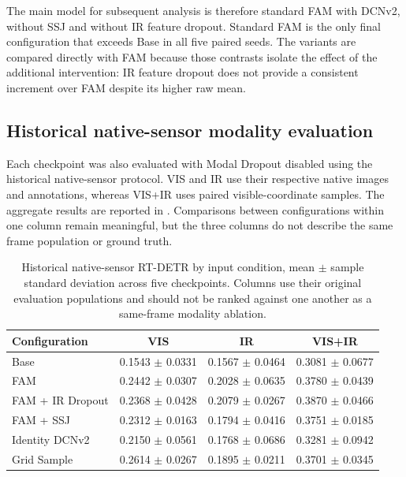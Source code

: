 The main model for subsequent analysis is therefore standard FAM with DCNv2,
without SSJ and without IR feature dropout. Standard FAM is the only final
configuration that exceeds Base in all five paired seeds. The variants are
compared directly with FAM because those contrasts isolate the effect of the
additional intervention: IR feature dropout does not provide a consistent
increment over FAM despite its higher raw mean.

\subsection{Historical native-sensor modality evaluation}

Each checkpoint was also evaluated with Modal Dropout disabled using the
historical native-sensor protocol. VIS and IR use their respective native
images and annotations, whereas VIS+IR uses paired visible-coordinate samples.
The aggregate \mapfifty{} results are reported in .
Comparisons between configurations within one column remain meaningful, but the
three columns do not describe the same frame population or ground truth.

\begin{table}[htbp]
  \centering
  \caption{Historical native-sensor RT-DETR \mapfifty{} by input
  condition, mean \(\pm\) sample standard deviation across five checkpoints.
  Columns use their original evaluation populations and should not be ranked
  against one another as a same-frame modality ablation.}
  \label{tab:rtdetr-modalities}
  \begin{tabular}{lccc}
    \toprule
    Configuration & VIS & IR & VIS+IR \\
    \midrule
    Base & 0.1543 \(\pm\) 0.0331 & 0.1567 \(\pm\) 0.0464 & 0.3081 \(\pm\) 0.0677 \\
    FAM & 0.2442 \(\pm\) 0.0307 & 0.2028 \(\pm\) 0.0635 & 0.3780 \(\pm\) 0.0439 \\
    FAM + IR Dropout & 0.2368 \(\pm\) 0.0428 & 0.2079 \(\pm\) 0.0267 & 0.3870 \(\pm\) 0.0466 \\
    FAM + SSJ & 0.2312 \(\pm\) 0.0163 & 0.1794 \(\pm\) 0.0416 & 0.3751 \(\pm\) 0.0185 \\
    Identity DCNv2 & 0.2150 \(\pm\) 0.0561 & 0.1768 \(\pm\) 0.0686 & 0.3281 \(\pm\) 0.0942 \\
    Grid Sample & 0.2614 \(\pm\) 0.0267 & 0.1895 \(\pm\) 0.0211 & 0.3701 \(\pm\) 0.0345 \\
    \bottomrule
  \end{tabular}
\end{table}

